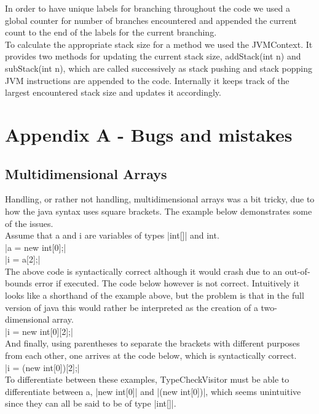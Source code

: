 \documentclass[paper=a4, fontsize=11pt]{scrartcl} %
\numberwithin{equation}{section} %
\numberwithin{figure}{section} %
\numberwithin{table}{section} %
\begin{document}
In order to have unique labels for branching throughout the code we used a global counter for number of branches encountered and appended the current count to the end of the labels for the current branching.\\

To calculate the appropriate stack size for a method we used the JVMContext. It provides two methods for updating the current stack size, addStack(int n) and subStack(int n), which are called successively as stack pushing and stack popping JVM instructions are appended to the code. Internally it keeps track of the largest encountered stack size and updates it accordingly.\\

\section{Appendix A - Bugs and mistakes}
\subsection{Multidimensional Arrays}
Handling, or rather not handling, multidimensional arrays was a bit tricky, due to how the java syntax uses square brackets. The example below demonstrates some of the issues.\\

Assume that a and i are variables of types |int[]| and int.\\

|a = new int[0];|\\
|i = a[2];|\\

The above code is syntactically correct although it would crash due to an out-of-bounds error if executed. The code below however is not correct. Intuitively it looks like a shorthand of the example above, but the problem is that in the full version of java this would rather be interpreted as the creation of a two-dimensional array.\\

|i = new int[0][2];|\\

And finally, using parentheses to separate the brackets with different purposes from each other, one arrives at the code below, which is syntactically correct.\\

|i = (new int[0])[2];|\\

To differentiate between these examples, TypeCheckVisitor must be able to differentiate between a, |new int[0]| and |(new int[0])|, which seems unintuitive since they can all be said to be of type |int[]|.
\end{document}
